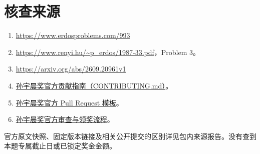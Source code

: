 \documentclass[UTF8,10pt,a4paper]{ctexart}
\begin{document}
\section{核查来源}
\begin{enumerate}
\item \url{https://www.erdosproblems.com/993}
\item \url{https://www.renyi.hu/~p_erdos/1987-33.pdf}，Problem 3。
\item \url{https://arxiv.org/abs/2609.20961v1}
\item \href{https://github.com/TheJustinSunPrize/awards/blob/main/CONTRIBUTING.md}{孙宇晨奖官方贡献指南（CONTRIBUTING.md）}。
\item \href{https://github.com/TheJustinSunPrize/awards/blob/main/.github/PULL_REQUEST_TEMPLATE.md}{孙宇晨奖官方 Pull Request 模板}。
\item \href{https://github.com/TheJustinSunPrize/awards/blob/main/docs/award-process.md}{孙宇晨奖官方审查与领奖流程}。
\end{enumerate}
官方原文快照、固定版本链接及相关公开提交的区别详见包内来源报告。没有查到本题专属截止日或已锁定奖金金额。
\end{document}
